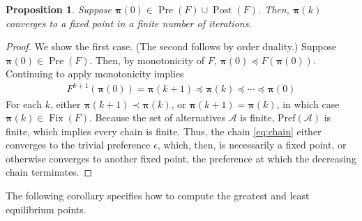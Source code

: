 \documentclass[conference]{ieeeconf}
\newcommand{\A}{\mathcal{A}}
\renewcommand{\P}{\mathcal{P}}
\newcommand{\Pref}{\mathrm{Pref}}
\renewcommand{\L}{\mathcal{L}}
\newcommand{\profile}{\boldsymbol{\pi}}
\renewcommand{\leq}{\leqslant}
\DeclareMathOperator{\Fix}{Fix}
\DeclareMathOperator{\Pre}{Pre}
\DeclareMathOperator{\Post}{Post}
\newtheorem{proposition}{Proposition}
\newtheorem{definition}{Definition}
\begin{document}




\begin{proposition} \label{prop:initial-conditions}
    Suppose $\profile(0) \in \Pre(F) \cup \Post(F)$. Then, $\profile(k)$ converges to a fixed point in a finite number of iterations.
\end{proposition}
\begin{proof}
    We show the first case. (The second follows by order duality.) Suppose $\profile(0) \in \Pre(F)$. Then, by monotonicity of $F$, $\profile(0) \preceq F\left(\profile(0) \right)$. Continuing to apply monotonicity implies
    \begin{align}
        F^{k+1}\left( \profile(0)\right)  = \profile(k+1) \preceq \profile(k) \preceq \cdots \preceq \profile(0) \label{eq:chain}
    \end{align} For each $k$, either $\profile(k+1) \prec \profile(k)$, or $\profile(k+1) = \profile(k)$, in which case $\profile(k) \in \Fix(F)$. Because the set of alternatives $\A$ is finite, $\Pref(\A)$ is finite, which implies every chain is finite. Thus, the chain \eqref{eq:chain} either converges to the trivial preference $\epsilon$, which, then, is necessarily a fixed point, or otherwise converges to another fixed point, the preference at which the decreasing chain terminates.
\end{proof}

The following corollary specifies how to compute the greatest and least equilibrium points.
\end{document}
